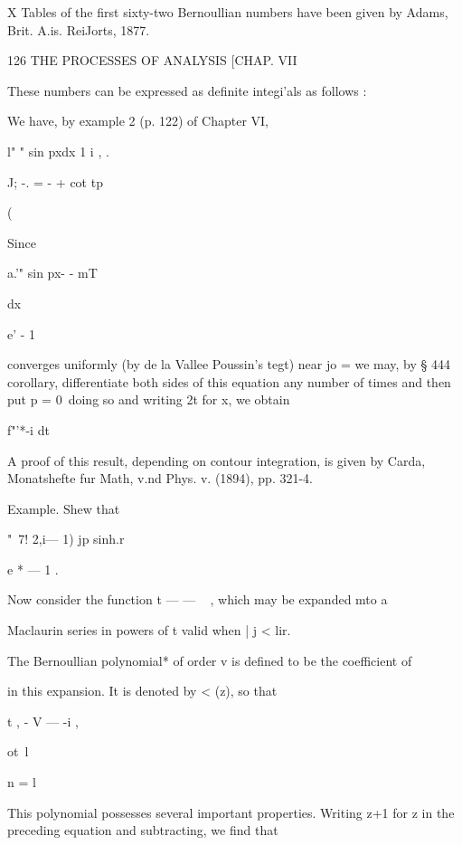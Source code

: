 X Tables of the first sixty-two Bernoullian numbers have been given by
Adams, Brit. A.is. ReiJorts, 1877.



126 THE PROCESSES OF ANALYSIS [CHAP. VII

These numbers can be expressed as definite integi'als as follows :

We have, by example 2 (p. 122) of Chapter VI,

l" " sin pxdx 1 i , .

J; -. = - + cot tp



(



Since



a.'" sin px- - mT\

dx

e' - 1



converges uniformly (by de la Vallee Poussin's tegt) near jo = we may,
by § 444 corollary, differentiate both sides of this equation any
number of times and then put p = 0\ doing so and writing 2t for x, we
obtain



f"'*-i dt






A proof of this result, depending on contour integration, is given by
Carda, Monatshefte fur Math, v.nd Phys. v. (1894), pp. 321-4.

Example. Shew that

"~7! 2,i— 1) jp sinh.r

e * — 1 .

Now consider the function t — — ~ , which may be expanded mto a

Maclaurin series in powers of t valid when | j < lir.

The Bernoullian polynomial* of order v is defined to be the
coefficient of



in this expansion. It is denoted by < (z), so that

t , - V — -i ,



ot\ l



n = l



This polynomial possesses several important properties. Writing z+1
for z in the preceding equation and subtracting, we find that

